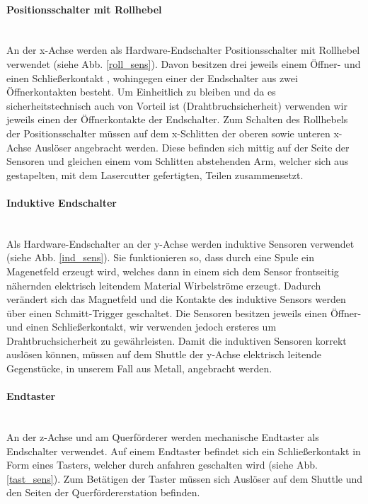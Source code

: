 \paragraph{Positionsschalter mit Rollhebel} \mbox{}\\
An der x-Achse werden als Hardware-Endschalter Positionsschalter mit Rollhebel verwendet (siehe Abb. \ref{roll_sens}). Davon besitzen drei jeweils einem Öffner- und einen Schließerkontakt \cite{schmersal_3}, wohingegen einer der Endschalter aus zwei Öffnerkontakten besteht. \cite{schmersal_1} Um Einheitlich zu bleiben und da es sicherheitstechnisch auch von Vorteil ist (Drahtbruchsicherheit) verwenden wir jeweils einen der Öffnerkontakte der Endschalter. Zum Schalten des Rollhebels der Positionsschalter müssen auf dem x-Schlitten der oberen sowie unteren x-Achse Auslöser angebracht werden. Diese befinden sich mittig auf der Seite der Sensoren und gleichen einem vom Schlitten abstehenden Arm, welcher sich aus gestapelten, mit dem Lasercutter gefertigten, Teilen zusammensetzt.

\paragraph{Induktive Endschalter} \mbox{}\\
Als Hardware-Endschalter an der y-Achse werden induktive Sensoren verwendet (siehe Abb. \ref{ind_sens}). Sie funktionieren so, dass durch eine Spule ein Magenetfeld erzeugt wird, welches dann in einem sich dem Sensor frontseitig nähernden elektrisch leitendem Material Wirbelströme erzeugt. Dadurch verändert sich das Magnetfeld und die Kontakte des induktive Sensors werden über einen Schmitt-Trigger geschaltet. Die Sensoren besitzen jeweils einen Öffner- und einen Schließerkontakt, wir verwenden jedoch ersteres um Drahtbruchsicherheit zu gewährleisten. Damit die induktiven Sensoren korrekt auslösen können, müssen auf dem Shuttle der y-Achse elektrisch leitende Gegenstücke, in unserem Fall aus Metall, angebracht werden.

\paragraph{Endtaster} \mbox{}\\
An der z-Achse und am Querförderer werden mechanische Endtaster als Endschalter verwendet. Auf einem Endtaster befindet sich ein Schließerkontakt in Form eines Tasters, welcher durch anfahren geschalten wird (siehe Abb. \ref{tast_sens}). Zum Betätigen der Taster müssen sich Auslöser auf dem Shuttle und den Seiten der Querfördererstation befinden.\\

